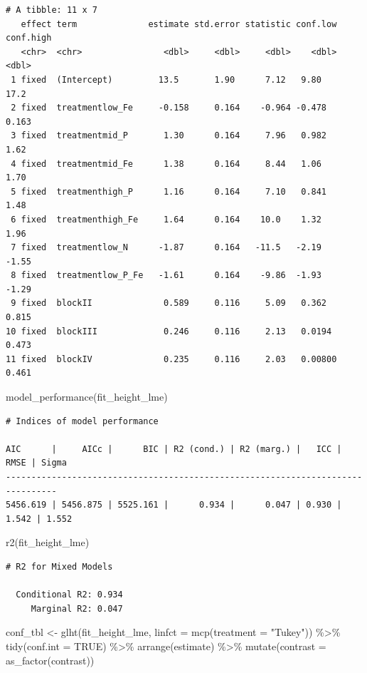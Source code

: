 \documentclass[
  letterpaper,
  DIV=11,
  oneside]{scrreport}
\newenvironment{Shaded}{\begin{snugshade}}{\end{snugshade}}
\newcommand{\AttributeTok}[1]{\textcolor[rgb]{0.40,0.45,0.13}{#1}}
\newcommand{\ConstantTok}[1]{\textcolor[rgb]{0.56,0.35,0.01}{#1}}
\newcommand{\FunctionTok}[1]{\textcolor[rgb]{0.28,0.35,0.67}{#1}}
\newcommand{\NormalTok}[1]{\textcolor[rgb]{0.00,0.23,0.31}{#1}}
\newcommand{\OtherTok}[1]{\textcolor[rgb]{0.00,0.23,0.31}{#1}}
\newcommand{\SpecialCharTok}[1]{\textcolor[rgb]{0.37,0.37,0.37}{#1}}
\newcommand{\StringTok}[1]{\textcolor[rgb]{0.13,0.47,0.30}{#1}}
\begin{document}
\begin{verbatim}
# A tibble: 11 x 7
   effect term              estimate std.error statistic conf.low conf.high
   <chr>  <chr>                <dbl>     <dbl>     <dbl>    <dbl>     <dbl>
 1 fixed  (Intercept)         13.5       1.90      7.12   9.80       17.2  
 2 fixed  treatmentlow_Fe     -0.158     0.164    -0.964 -0.478       0.163
 3 fixed  treatmentmid_P       1.30      0.164     7.96   0.982       1.62 
 4 fixed  treatmentmid_Fe      1.38      0.164     8.44   1.06        1.70 
 5 fixed  treatmenthigh_P      1.16      0.164     7.10   0.841       1.48 
 6 fixed  treatmenthigh_Fe     1.64      0.164    10.0    1.32        1.96 
 7 fixed  treatmentlow_N      -1.87      0.164   -11.5   -2.19       -1.55 
 8 fixed  treatmentlow_P_Fe   -1.61      0.164    -9.86  -1.93       -1.29 
 9 fixed  blockII              0.589     0.116     5.09   0.362       0.815
10 fixed  blockIII             0.246     0.116     2.13   0.0194      0.473
11 fixed  blockIV              0.235     0.116     2.03   0.00800     0.461
\end{verbatim}

\begin{Shaded}
\begin{Highlighting}[]
\FunctionTok{model\_performance}\NormalTok{(fit\_height\_lme) }
\end{Highlighting}
\end{Shaded}

\begin{verbatim}
# Indices of model performance

AIC      |     AICc |      BIC | R2 (cond.) | R2 (marg.) |   ICC |  RMSE | Sigma
--------------------------------------------------------------------------------
5456.619 | 5456.875 | 5525.161 |      0.934 |      0.047 | 0.930 | 1.542 | 1.552
\end{verbatim}

\begin{Shaded}
\begin{Highlighting}[]
\FunctionTok{r2}\NormalTok{(fit\_height\_lme)}
\end{Highlighting}
\end{Shaded}

\begin{verbatim}
# R2 for Mixed Models

  Conditional R2: 0.934
     Marginal R2: 0.047
\end{verbatim}

\begin{Shaded}
\begin{Highlighting}[]
\NormalTok{conf\_tbl }\OtherTok{\textless{}{-}} \FunctionTok{glht}\NormalTok{(fit\_height\_lme, }\AttributeTok{linfct =} \FunctionTok{mcp}\NormalTok{(}\AttributeTok{treatment =} \StringTok{"Tukey"}\NormalTok{)) }\SpecialCharTok{\%\textgreater{}\%} 
  \FunctionTok{tidy}\NormalTok{(}\AttributeTok{conf.int =} \ConstantTok{TRUE}\NormalTok{) }\SpecialCharTok{\%\textgreater{}\%} 
  \FunctionTok{arrange}\NormalTok{(estimate) }\SpecialCharTok{\%\textgreater{}\%} 
  \FunctionTok{mutate}\NormalTok{(}\AttributeTok{contrast =} \FunctionTok{as\_factor}\NormalTok{(contrast))}
\end{Highlighting}
\end{Shaded}
\end{document}

